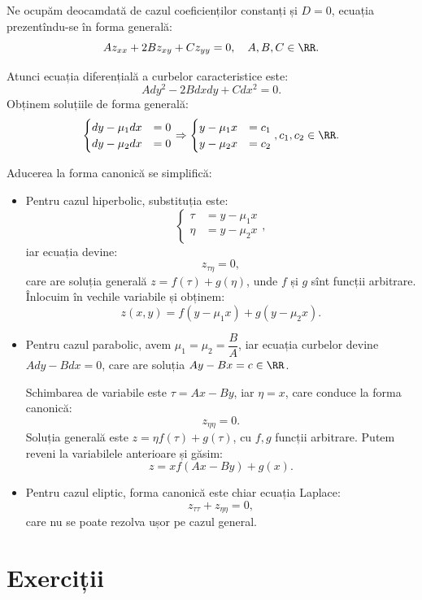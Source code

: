 Ne ocupăm deocamdată de cazul coeficienților constanți și $ D = 0 $, ecuația prezentîndu-se
în forma generală:
\[
  A z_{xx} + 2B z_{xy} + C z_{yy} = 0, \quad A, B, C \in \RR.
\]

Atunci ecuația diferențială a curbelor caracteristice este:
\[
  Ady^2 - 2Bdxdy + Cdx^2 = 0.
\]
Obținem soluțiile de forma generală:
\[
  \begin{cases}
    dy - \mu_1 dx &= 0 \\
    dy - \mu_2 dx &= 0
  \end{cases} \Rightarrow
  \begin{cases}
    y - \mu_1 x &= c_1 \\
    y - \mu_2 x &= c_2
  \end{cases}, c_1, c_2 \in \RR.
\]

Aducerea la forma canonică se simplifică:
\begin{itemize}
\item Pentru cazul hiperbolic, substituția este:
  \[
    \begin{cases}
      \tau &= y - \mu_1 x \\
      \eta &= y - \mu_2 x
    \end{cases},
  \]
  iar ecuația devine:
  \[
    z_{\tau\eta} = 0,
  \]
  care are soluția generală $ z = f(\tau) + g(\eta) $, unde $ f $ și $ g $ sînt
  funcții arbitrare. Înlocuim în vechile variabile și obținem:
  \[
    z(x, y) = f(y - \mu_1 x) + g(y - \mu_2 x).
  \]
\item Pentru cazul parabolic, avem $ \mu_1 = \mu_2 = \dfrac{B}{A} $, iar ecuația
  curbelor devine $ Ady - Bdx = 0 $, care are soluția $ Ay - Bx = c \in \RR $.

  Schimbarea de variabile este $ \tau = Ax - By $, iar $ \eta = x $, care conduce
  la forma canonică:
  \[
    z_{\eta\eta} = 0.
  \]
  Soluția generală este $ z = \eta f(\tau) + g(\tau) $, cu $ f, g $ funcții arbitrare.
  Putem reveni la variabilele anterioare și găsim:
  \[
    z = x f(Ax - By) + g(x).
  \]
\item Pentru cazul eliptic, forma canonică este chiar ecuația Laplace:
  \[
    z_{\tau\tau} + z_{\eta\eta} = 0,
  \]
  care nu se poate rezolva ușor pe cazul general.
\end{itemize}

\section{Exerciții}

